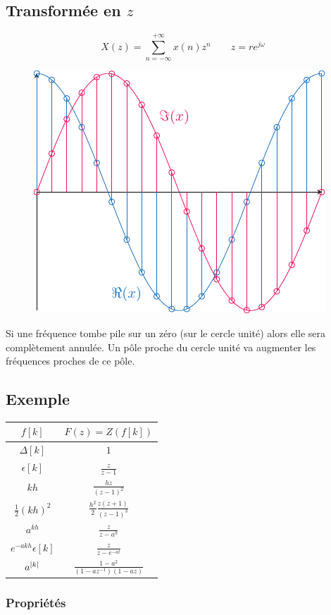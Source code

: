\documentclass[resume]{subfiles}
\begin{document}
\subsection{Transformée en $z$}
$$X(z)=\sum_{n=-\infty}^{+\infty}x(n)z^{n}\qquad z=re^{j\omega}$$
\begin{figure}[H]
\centering
\includegraphics[width=0.9\columnwidth,page=3]{drwg_2.pdf}
\end{figure}
Si une fréquence tombe pile sur un zéro (sur le cercle unité) alors elle sera complètement annulée. Un pôle proche du cercle unité va augmenter les fréquences proches de ce pôle.
\subsection{Exemple}
\begin{center}
\renewcommand{\arraystretch}{1.5}
\begin{tabular}{cc}
$f[k]$ & $F(z)=Z(f[k])$\\\hline
$\Delta[k]$ & $1$\\
$\epsilon[k]$ & $\frac{z}{z-1}$\\
$kh$ & $\frac{hz}{(z-1)^2}$\\
$\frac{1}{2}(kh)^2$ & $\frac{h^2}{2}\frac{z(z+1)}{(z-1)^3}$\\
$a^{kh}$ & $\frac{z}{z-a^h}$\\
$e^{-akh}\epsilon[k]$ & $\frac{z}{z-e^{-at}}$\\
$a^{\abs{k}}$ & $\frac{1-a^2}{(1-az^{-1})(1-az)}$
\end{tabular}
\end{center}
\subsubsection{Propriétés}
\end{document}
